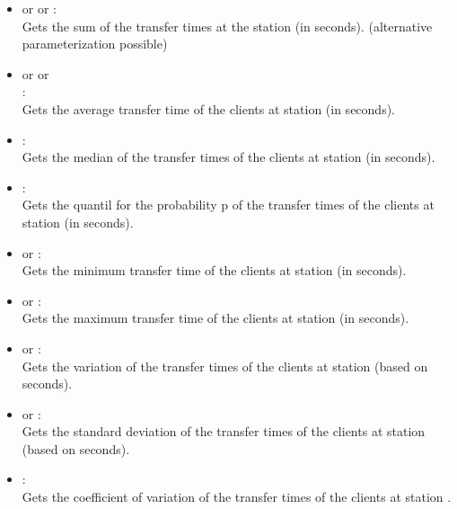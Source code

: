 \begin{itemize}

\item
{} or  or :\\
Gets the sum of the transfer times at the station  (in seconds).
(alternative parameterization possible)

\item
{} or  or\\
:\\
Gets the average transfer time of the clients at station  (in seconds).

\item
{}:\\
Gets the median of the transfer times of the clients at station  (in seconds).

\item
{}:\\
Gets the quantil for the probability p of the transfer times of the clients at station  (in seconds).

\item
{} or :\\
Gets the minimum transfer time of the clients at station  (in seconds).

\item
{} or :\\
Gets the maximum transfer time of the clients at station  (in seconds).

\item
{} or :\\
Gets the variation of the transfer times of the clients at station  (based on seconds).

\item
{} or :\\
Gets the standard deviation of the transfer times of the clients at station  (based on seconds).

\item
{}:\\
Gets the coefficient of variation of the transfer times of the clients at station .


\end{itemize}
